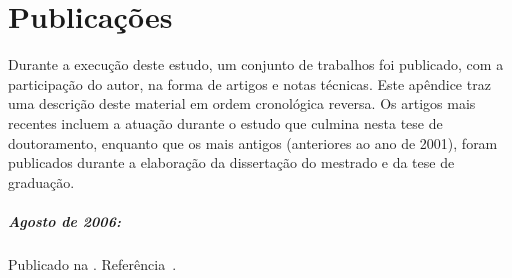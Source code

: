 \typeout{ ====================================================================}
\typeout{ ====================================================================}












\chapter{Publicações}
\label{ap:published}

Durante a execução deste estudo, um conjunto de trabalhos foi publicado, com a
participação do autor, na forma de artigos e notas técnicas. Este apêndice
traz uma descrição deste material em ordem cronológica reversa. Os artigos
mais recentes incluem a atuação durante o estudo que culmina nesta tese de
doutoramento, enquanto que os mais antigos (anteriores ao ano de 2001), foram
publicados durante a elaboração da dissertação do mestrado e da tese de
graduação.

\paragraph{Agosto de 2006: } Publicado na . Referência~\cite{aa:tns-06}.

